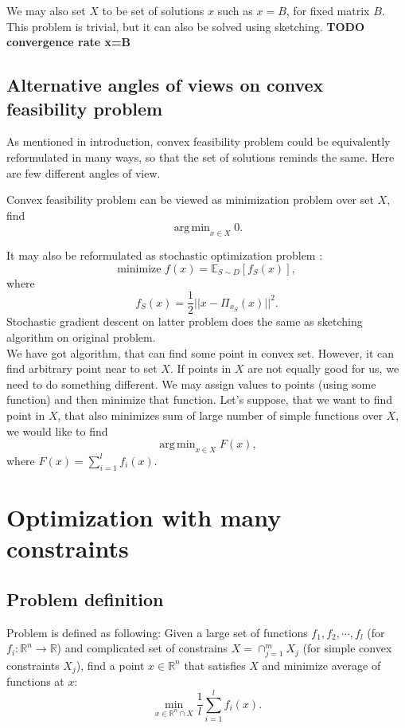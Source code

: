 \documentclass[11pt]{book}
\newcommand{\R}{\mathbb{R}}
\newcommand{\E}{\mathbb{E}}
\DeclareMathOperator*{\argmin}{arg\,min}
\begin{document}
We may also set $X$ to be set of solutions $x$ such as $x=B$, for fixed matrix $B$. This problem is trivial, but it can also be solved using sketching. \textbf{TODO convergence rate x=B}\\

\section{Alternative angles of views on convex feasibility problem}
As mentioned in introduction, convex feasibility problem could be equivalently reformulated in many ways, so that the set of solutions reminds the same. Here are few different angles of view.

Convex feasibility problem can be viewed as minimization problem over set $X$, find $$\argmin_{x \in X} 0.$$

It may also be reformulated as stochastic optimization problem \cite{sketchAndProject}: $$\text{minimize } f(x)=\E_{S \sim D}[f_S(x)],$$ where $$f_S(x) = \frac{1}{2}||x-\Pi_{x_S}(x)||^2.$$
Stochastic gradient descent on latter problem does the same as sketching algorithm on original problem.\\

We have got algorithm, that can find some point in convex set. However, it can find arbitrary point near to set $X$. If points in $X$ are not equally good for us, we need to do something different. We may assign values to points (using some function) and then minimize that function. Let's suppose, that we want to find point in $X$, that also minimizes sum of large number of simple functions over $X$, we would like to find $$\argmin_{x \in X} F(x),$$ where $F(x)=\sum_{i=1}^{l}f_i(x).$



\chapter{Optimization with many constraints}

\section{Problem definition}
Problem is defined as following: Given a large set of functions $f_1,f_2,\cdots,f_l$ (for $f_i: \R^n \rightarrow \R$) and complicated set of constrains $X = \cap_{j=1}^m X_j$ (for simple convex constraints $X_j$), find a point $x \in \R^n$ that satisfies $X$ and minimize average of functions at $x$: $$ \min_{x \in \R^n \cap X} \frac{1}{l}\sum_{i=1}^l f_i(x).$$
\end{document}
